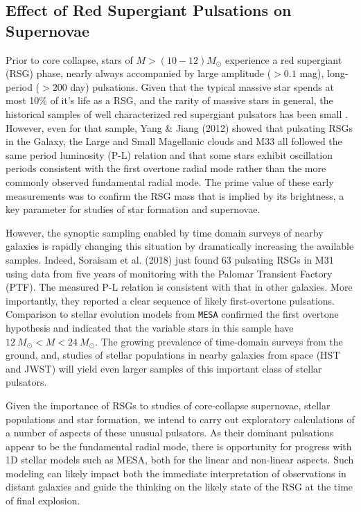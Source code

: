 {\color{green}

\subsection{Effect of Red Supergiant Pulsations on Supernovae}
}

Prior to core collapse, stars of $M>(10-12) M_\odot$ experience a red
supergiant (RSG) phase, nearly always accompanied by large amplitude
($>0.1$ mag), long-period ($>200 $ day) pulsations.  Given that the
typical massive star spends at most 10$\%$ of it's life as a RSG, and
the rarity of massive stars in general, the historical samples of well
characterized red supergiant pulsators has been small \citep[see][for a nice compilation]{Yang_2012}. However, even for
that sample, Yang \& Jiang (2012) showed that pulsating RSGs in the
Galaxy, the Large and Small Magellanic clouds and M33 all followed the
same period luminosity (P-L) relation and that some stars exhibit
oscillation periods consistent with the first overtone radial mode
rather than the more commonly observed fundamental radial mode. The
prime value of these early measurements was to confirm the RSG mass
that is implied by its brightness, a key parameter for studies of star
formation and supernovae.

However, the synoptic sampling enabled by time domain surveys of
nearby galaxies is rapidly changing this situation by dramatically
increasing the available samples. Indeed, Soraisam et al. (2018) just
found 63 pulsating RSGs in M31 using data from five years of
monitoring with the Palomar Transient Factory (PTF). The measured P-L
relation is consistent with that in other galaxies. More importantly,
they reported a clear sequence of likely first-overtone
pulsations. Comparison to stellar evolution models from \texttt{MESA}
confirmed the first overtone hypothesis and indicated that the
variable stars in this sample have $12~M_{\odot}<M<24~M_{\odot}$. The growing prevalence of 
time-domain surveys from the ground, and, studies 
of stellar populations in nearby galaxies from space (HST and JWST) 
will yield even larger samples of this important class of stellar pulsators. 

 Given the importance of RSGs to studies of core-collapse supernovae,
stellar populations and star formation, we intend to carry out
exploratory calculations of a number of aspects of these unusual
pulsators. As their dominant pulsations appear to be the fundamental
radial mode, there is opportunity for progress with 1D stellar models
such as MESA, both for the linear and non-linear aspects. Such
modeling can likely impact both the immediate interpretation of observations in
distant galaxies and guide the thinking on the likely state of the RSG
at the time of final explosion. 